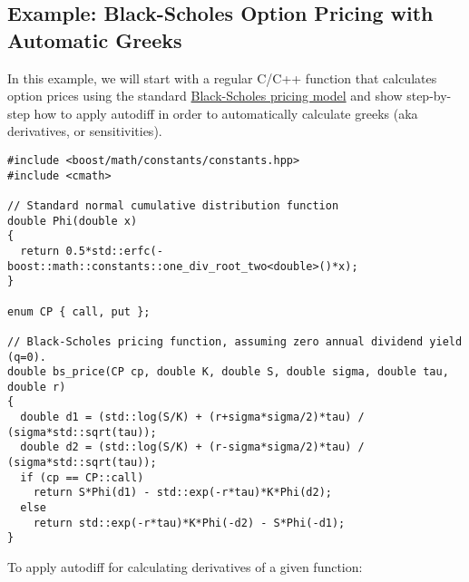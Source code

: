 \documentclass{article}
\begin{document}
\subsection{Example: Black-Scholes Option Pricing with Automatic Greeks}

In this example, we will start with a regular C/C++ function that calculates option prices using the standard
\href{https://en.wikipedia.org/wiki/Greeks_(finance)#Formulas_for_European_option_Greeks}{Black-Scholes pricing
model} and show step-by-step how to apply autodiff in order to automatically calculate greeks (aka derivatives,
or sensitivities).

\begingroup
\fontsize{10pt}{10pt}\selectfont
\begin{verbatim}
#include <boost/math/constants/constants.hpp>
#include <cmath>

// Standard normal cumulative distribution function
double Phi(double x)
{
  return 0.5*std::erfc(-boost::math::constants::one_div_root_two<double>()*x);
}

enum CP { call, put };

// Black-Scholes pricing function, assuming zero annual dividend yield (q=0).
double bs_price(CP cp, double K, double S, double sigma, double tau, double r)
{
  double d1 = (std::log(S/K) + (r+sigma*sigma/2)*tau) / (sigma*std::sqrt(tau));
  double d2 = (std::log(S/K) + (r-sigma*sigma/2)*tau) / (sigma*std::sqrt(tau));
  if (cp == CP::call)
    return S*Phi(d1) - std::exp(-r*tau)*K*Phi(d2);
  else
    return std::exp(-r*tau)*K*Phi(-d2) - S*Phi(-d1);
}
\end{verbatim}
\endgroup
To apply autodiff for calculating derivatives of a given function:
\end{document}
